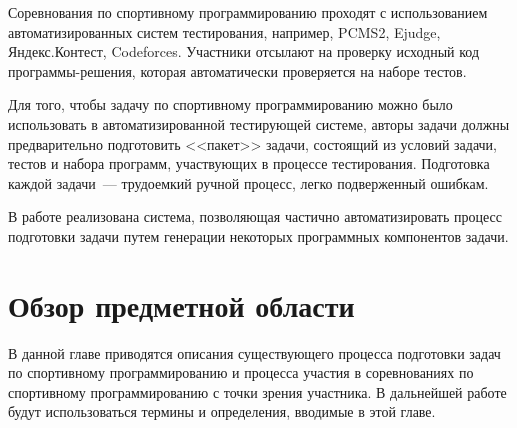 \documentclass[times,specification,annotation]{style/itmo-student-thesis/itmo-student-thesis}
\begin{document}
\tableofcontents

\startprefacepage

Соревнования по спортивному программированию проходят с использованием автоматизированных систем тестирования, например, PCMS2, Ejudge, Яндекс.Контест, Codeforces. Участники отсылают на проверку исходный код программы-решения, которая автоматически проверяется на наборе тестов. 

Для того, чтобы задачу по спортивному программированию можно было использовать в автоматизированной тестирующей системе, авторы задачи должны предварительно подготовить <<пакет>> задачи, состоящий из условий задачи, тестов и набора программ, участвующих в процессе тестирования. Подготовка каждой задачи~--- трудоемкий ручной процесс, легко подверженный ошибкам.

В работе реализована система, позволяющая частично автоматизировать процесс подготовки задачи путем генерации некоторых  программных компонентов задачи.




\chapter{Обзор предметной области}


В данной главе приводятся описания существующего процесса подготовки задач по спортивному программированию и процесса участия в соревнованиях по спортивному программированию с точки зрения участника. В дальнейшей работе будут использоваться термины и определения, вводимые в этой главе.
\end{document}

